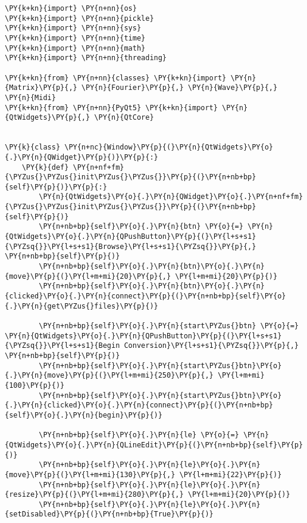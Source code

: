 \begin{Verbatim}[commandchars=\\\{\}]
\PY{k+kn}{import} \PY{n+nn}{os}
\PY{k+kn}{import} \PY{n+nn}{pickle}
\PY{k+kn}{import} \PY{n+nn}{sys}
\PY{k+kn}{import} \PY{n+nn}{time}
\PY{k+kn}{import} \PY{n+nn}{math}
\PY{k+kn}{import} \PY{n+nn}{threading}

\PY{k+kn}{from} \PY{n+nn}{classes} \PY{k+kn}{import} \PY{n}{Matrix}\PY{p}{,} \PY{n}{Fourier}\PY{p}{,} \PY{n}{Wave}\PY{p}{,} \PY{n}{Midi}
\PY{k+kn}{from} \PY{n+nn}{PyQt5} \PY{k+kn}{import} \PY{n}{QtWidgets}\PY{p}{,} \PY{n}{QtCore}


\PY{k}{class} \PY{n+nc}{Window}\PY{p}{(}\PY{n}{QtWidgets}\PY{o}{.}\PY{n}{QWidget}\PY{p}{)}\PY{p}{:}
    \PY{k}{def} \PY{n+nf+fm}{\PYZus{}\PYZus{}init\PYZus{}\PYZus{}}\PY{p}{(}\PY{n+nb+bp}{self}\PY{p}{)}\PY{p}{:}
        \PY{n}{QtWidgets}\PY{o}{.}\PY{n}{QWidget}\PY{o}{.}\PY{n+nf+fm}{\PYZus{}\PYZus{}init\PYZus{}\PYZus{}}\PY{p}{(}\PY{n+nb+bp}{self}\PY{p}{)}
        \PY{n+nb+bp}{self}\PY{o}{.}\PY{n}{btn} \PY{o}{=} \PY{n}{QtWidgets}\PY{o}{.}\PY{n}{QPushButton}\PY{p}{(}\PY{l+s+s1}{\PYZsq{}}\PY{l+s+s1}{Browse}\PY{l+s+s1}{\PYZsq{}}\PY{p}{,} \PY{n+nb+bp}{self}\PY{p}{)}
        \PY{n+nb+bp}{self}\PY{o}{.}\PY{n}{btn}\PY{o}{.}\PY{n}{move}\PY{p}{(}\PY{l+m+mi}{20}\PY{p}{,} \PY{l+m+mi}{20}\PY{p}{)}
        \PY{n+nb+bp}{self}\PY{o}{.}\PY{n}{btn}\PY{o}{.}\PY{n}{clicked}\PY{o}{.}\PY{n}{connect}\PY{p}{(}\PY{n+nb+bp}{self}\PY{o}{.}\PY{n}{get\PYZus{}files}\PY{p}{)}

        \PY{n+nb+bp}{self}\PY{o}{.}\PY{n}{start\PYZus{}btn} \PY{o}{=} \PY{n}{QtWidgets}\PY{o}{.}\PY{n}{QPushButton}\PY{p}{(}\PY{l+s+s1}{\PYZsq{}}\PY{l+s+s1}{Begin Conversion}\PY{l+s+s1}{\PYZsq{}}\PY{p}{,} \PY{n+nb+bp}{self}\PY{p}{)}
        \PY{n+nb+bp}{self}\PY{o}{.}\PY{n}{start\PYZus{}btn}\PY{o}{.}\PY{n}{move}\PY{p}{(}\PY{l+m+mi}{250}\PY{p}{,} \PY{l+m+mi}{100}\PY{p}{)}
        \PY{n+nb+bp}{self}\PY{o}{.}\PY{n}{start\PYZus{}btn}\PY{o}{.}\PY{n}{clicked}\PY{o}{.}\PY{n}{connect}\PY{p}{(}\PY{n+nb+bp}{self}\PY{o}{.}\PY{n}{begin}\PY{p}{)}

        \PY{n+nb+bp}{self}\PY{o}{.}\PY{n}{le} \PY{o}{=} \PY{n}{QtWidgets}\PY{o}{.}\PY{n}{QLineEdit}\PY{p}{(}\PY{n+nb+bp}{self}\PY{p}{)}
        \PY{n+nb+bp}{self}\PY{o}{.}\PY{n}{le}\PY{o}{.}\PY{n}{move}\PY{p}{(}\PY{l+m+mi}{130}\PY{p}{,} \PY{l+m+mi}{22}\PY{p}{)}
        \PY{n+nb+bp}{self}\PY{o}{.}\PY{n}{le}\PY{o}{.}\PY{n}{resize}\PY{p}{(}\PY{l+m+mi}{280}\PY{p}{,} \PY{l+m+mi}{20}\PY{p}{)}
        \PY{n+nb+bp}{self}\PY{o}{.}\PY{n}{le}\PY{o}{.}\PY{n}{setDisabled}\PY{p}{(}\PY{n+nb+bp}{True}\PY{p}{)}
        

\end{Verbatim}
